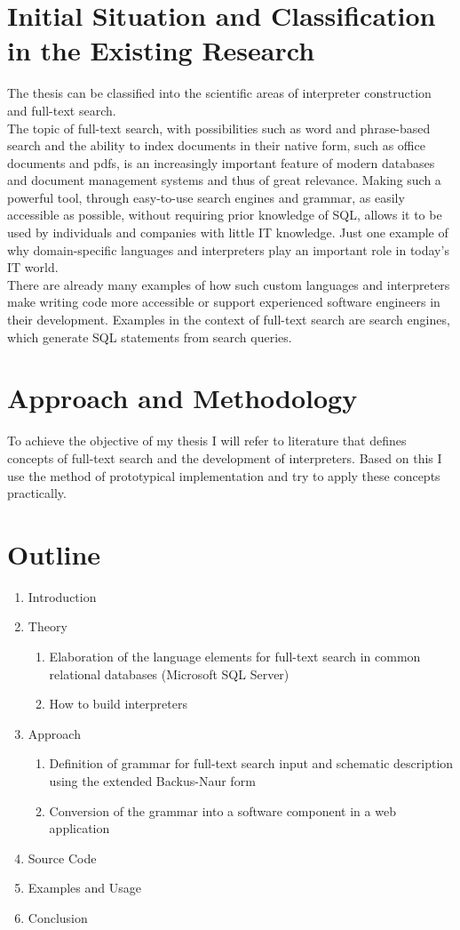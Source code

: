 \section{Initial Situation and Classification in the Existing Research}
The thesis can be classified into the scientific areas of interpreter construction and full-text search.\\
The topic of full-text search, with possibilities such as word and phrase-based search and the ability to index documents in their native form, such as office documents and pdfs, is an increasingly important feature of modern databases and document management systems and thus of great relevance. Making such a powerful tool, through easy-to-use search engines and grammar, as easily accessible as possible, without requiring prior knowledge of SQL, allows it to be used by individuals and companies with little IT knowledge. Just one example of why domain-specific languages and interpreters play an important role in today's IT world.\\
There are already many examples of how such custom languages and interpreters make writing code more accessible or support experienced software engineers in their development. Examples in the context of full-text search are search engines, which generate SQL statements from search queries.
\section{Approach and Methodology}
To achieve the objective of my thesis I will refer to literature that defines concepts of full-text search and the development of interpreters. Based on this I use the method of prototypical implementation and try to apply these concepts practically.
\section{Outline}
\begin{enumerate}
    \item Introduction
    \item Theory
    \begin{enumerate}
        \item Elaboration of the language elements for full-text search in common relational databases (Microsoft SQL Server)
        \item How to build interpreters
    \end{enumerate}
    \item Approach
    \begin{enumerate}
        \item Definition of grammar for full-text search input and schematic description using the extended Backus-Naur form
        \item Conversion of the grammar into a software component in a web application
    \end{enumerate}
    \item Source Code
    \item Examples and Usage
    \item Conclusion
\end{enumerate}